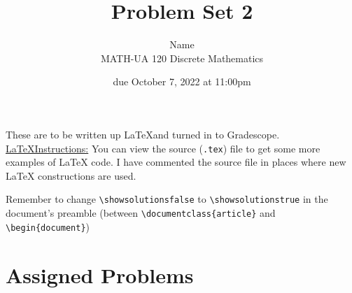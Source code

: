 \documentclass{article}
\title{Problem Set 2}
\author{%
    Name
\\  MATH-UA 120 Discrete Mathematics
}
\date{due October 7, 2022 at 11:00pm}
\newif\ifshowsolutions
\newcommand{\danger}{\marginpar[\hfill\dbend]{\dbend\hfill}}
\theoremstyle{definition}
\begin{document}
\maketitle



These are to be written up \LaTeX and turned in to Gradescope.\\



\ifshowsolutions
    \SetupExSheets{solution/print=true}
\else
    \danger
 \underline{ \LaTeX  Instructions:}  You can view the source (\texttt{.tex}) file to get some more examples of \LaTeX{} code.  I have commented the source file in places where new \LaTeX{} constructions are used.
  
  Remember to change \verb|\showsolutionsfalse| to \verb|\showsolutionstrue|
    in the document's preamble 
    (between \verb|\documentclass{article}| and \verb|\begin{document}|)
\fi

\section*{Assigned Problems}
\end{document}
